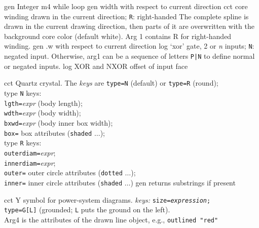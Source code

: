 %

%
  {gen}%
  {Integer m4 while loop}%
%
  {gen}%
  {width with respect to current direction}%
%
  {cct}%
  {core winding drawn in the current direction; {\tt R}: right-handed
   The complete spline is drawn in the current drawing direction, then
   parts of it are overwritten with the background core color (default white).
   Arg 1 contains R for right-handed winding.
   }%
%
  {gen}%
  {.w with respect to current direction}%
%
  {log}%
  {`xor' gate, 2 or {\sl n\/} inputs; {\tt N}: negated input.
   Otherwise, arg1 can be a sequence of letters {\tt P|N} to define
   normal or negated inputs.
    }%
%
  {log}%
  {XOR and NXOR offset of input face}%

%

%
  {cct}%
  {Quartz crystal. The {\sl keys} are
     {\tt type=N} (default) or {\tt type=R} (round);\\
            type {\tt N} keys:\\
              {\tt lgth=}{\sl expr} (body length);\\
              {\tt wdth=}{\sl expr} (body width);\\
              {\tt bxwd=}{\sl expr} (body inner box width);\\
              {\tt box=} box attributes ({\tt shaded} $\ldots$);\\
            type {\tt R} keys:\\
              {\tt outerdiam=}{\sl expr};\\
              {\tt innerdiam=}{\sl expr};\\
              {\tt outer=} outer circle attributes ({\tt dotted} $\ldots$);\\
              {\tt inner=} inner circle attributes ({\tt shaded} $\ldots$)%
}%
%
  {gen}%
  {returns substrings if present}%

%

%
  {cct}%
  {Y symbol for power-system diagrams.
   {\sl keys:} {\tt size={\sl expression};\\
   type=G[L]} (grounded; {\tt L} puts the ground on the left).\\
   Arg4 is the attributes of the drawn line object,
   e.g., {\tt outlined "red"}}%


